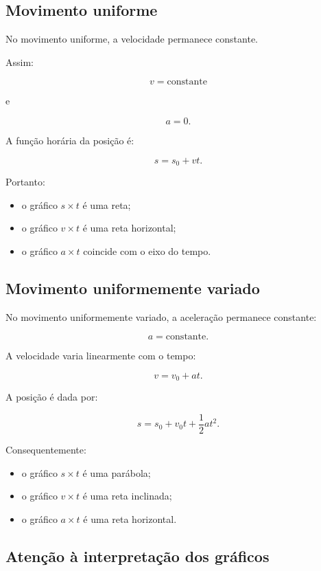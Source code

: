 \documentclass[a4paper,12pt]{article}
\begin{document}
\subsection{Movimento uniforme}

No movimento uniforme, a velocidade permanece constante.

Assim:

\[
v=\text{constante}
\]

e

\[
a=0.
\]

A função horária da posição é:

\[
s=s_0+vt.
\]

Portanto:

\begin{itemize}
    \item o gráfico $s\times t$ é uma reta;
    \item o gráfico $v\times t$ é uma reta horizontal;
    \item o gráfico $a\times t$ coincide com o eixo do tempo.
\end{itemize}

\subsection{Movimento uniformemente variado}

No movimento uniformemente variado, a aceleração permanece constante:

\[
a=\text{constante}.
\]

A velocidade varia linearmente com o tempo:

\[
v=v_0+at.
\]

A posição é dada por:

\[
s=s_0+v_0t+\frac{1}{2}at^2.
\]

Consequentemente:

\begin{itemize}
    \item o gráfico $s\times t$ é uma parábola;
    \item o gráfico $v\times t$ é uma reta inclinada;
    \item o gráfico $a\times t$ é uma reta horizontal.
\end{itemize}

\subsection{Atenção à interpretação dos gráficos}
\end{document}

